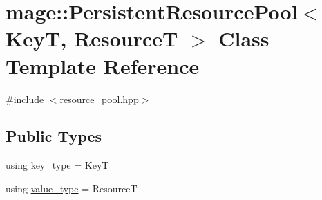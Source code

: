 \hypertarget{classmage_1_1_persistent_resource_pool}{}\section{mage\+:\+:Persistent\+Resource\+Pool$<$ KeyT, ResourceT $>$ Class Template Reference}
\label{classmage_1_1_persistent_resource_pool}


{\ttfamily \#include $<$resource\+\_\+pool.\+hpp$>$}

\subsection*{Public Types}
\begin{DoxyCompactItemize}
\item 
using \hyperlink{classmage_1_1_persistent_resource_pool_a8041d9d11d2307efc6d5b6dd43074e0c}{key\+\_\+type} = KeyT
\item 
using \hyperlink{classmage_1_1_persistent_resource_pool_a2311ac7d92bb3c23950c2d88e9213d16}{value\+\_\+type} = ResourceT
\end{DoxyCompactItemize}
